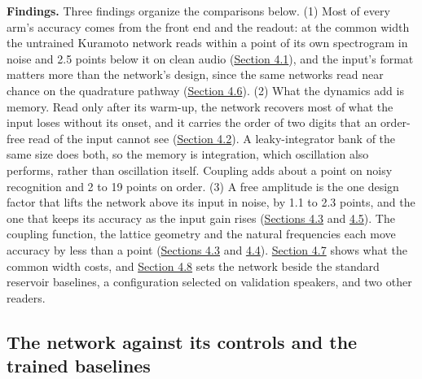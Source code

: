 \documentclass{article}
\begin{document}
\textbf{Findings.} Three findings organize the comparisons below. (1)
Most of every arm's accuracy comes from the front end and the readout:
at the common width the untrained Kuramoto network reads within a point
of its own spectrogram in noise and 2.5 points below it on clean audio
(\hyperref[sec-4-1]{Section 4.1}), and the input's format matters more
than the network's design, since the same networks read near chance on
the quadrature pathway (\hyperref[sec-4-6]{Section 4.6}). (2) What the
dynamics add is memory. Read only after its warm-up, the network
recovers most of what the input loses without its onset, and it carries
the order of two digits that an order-free read of the input cannot see
(\hyperref[sec-4-2]{Section 4.2}). A leaky-integrator bank of the same
size does both, so the memory is integration, which oscillation also
performs, rather than oscillation itself. Coupling adds about a point on
noisy recognition and 2 to 19 points on order. (3) A free amplitude is
the one design factor that lifts the network above its input in noise,
by 1.1 to 2.3 points, and the one that keeps its accuracy as the input
gain rises (\hyperref[sec-4-3]{Sections 4.3} and
\hyperref[sec-4-5]{4.5}). The coupling function, the lattice geometry
and the natural frequencies each move accuracy by less than a point
(\hyperref[sec-4-3]{Sections 4.3} and \hyperref[sec-4-4]{4.4}).
\hyperref[sec-4-7]{Section 4.7} shows what the common width costs, and
\hyperref[sec-4-8]{Section 4.8} sets the network beside the standard
reservoir baselines, a configuration selected on validation speakers,
and two other readers.

\subsection{The network against its controls and the trained
baselines}\label{sec-4-1}
\end{document}
